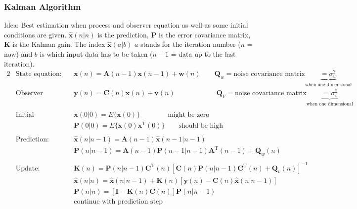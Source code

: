 \subsubsection{Kalman Algorithm}
Idea: Best estimation when process and observer equation as well as some initial conditions are given.
$\mathbf{\hat x}(n|n)$ is the prediction, $\mathbf{P}$ is the error covariance matrix, $\mathbf{K}$ is the Kalman gain.
The index $\mathbf{\hat x}(a|b)$ $a$ stands for the iteration number ($n$ = now) and $b$ is which input
data has to be taken ($n-1$ = data up to the last iteration). 
\begin{alignat}{2}
    &\text{State equation:}\qquad&&\mathbf{x}(n) =\mathbf{A}(n-1)\mathbf{x}(n-1) + \mathbf{w}(n) \qquad 
     \mathbf{Q}_w = \text{noise covariance matrix} \underbrace{= \sigma_w^2}_{\text{when one dimensional}}  \nonumber\\
    &\text{Observer equation:}\qquad&&\mathbf{y}(n) =\mathbf{C}(n)\mathbf{x}(n) + \mathbf{v}(n) \qquad \qquad \quad \quad
   \mathbf{Q}_V = \text{noise covariance matrix} \underbrace{= \sigma_v^2}_{\text{when one dimensional}} \nonumber\\
    \nonumber\\
    &\text{Initial condition:}    \qquad    &&\mathbf{x}(0|0)=E\{\mathbf{x}(0)\} \qquad \qquad \text{might be zero}\nonumber\\
                                        &&&\mathbf{P}(0|0)=E\{\mathbf{x}(0)\mathbf{x}^{\mathrm T}(0)\} \qquad \text{should be high}\nonumber\\
    \nonumber\\
    &\text{Prediction:}            \qquad    &&\mathbf{\hat{x}}(n|n-1)=\mathbf{A}(n-1)\mathbf{\hat{x}}(n-1|n-1)\\
                                        &&&\mathbf{P}(n|n-1)=\mathbf{A}(n-1)\mathbf{P}(n-1|n-1)\mathbf{A}^{\mathrm T}(n-1) + \mathbf{Q}_w(n)\\
    \nonumber\\
    &\text{Update:}                \qquad    &&\mathbf{K}(n)=\mathbf{P}(n|n-1)\mathbf{C}^{\mathrm T}(n)\left[\mathbf{C}(n) \mathbf{P}(n|n-1)\mathbf{C}^{\mathrm T}(n)+\mathbf{Q}_v(n)\right]^{-1}\\
                                        &&&\mathbf{\hat{x}}(n|n)=\mathbf{\hat{x}}(n|n-1)+\mathbf{K}(n)\left[\mathbf{y}(n)-\mathbf{C}(n)\mathbf{\hat{x}}(n|n-1)\right]\\
                                        &&&\mathbf{P}(n|n)=\left[\mathbf{I}-\mathbf{K}(n)\mathbf{C}(n)\right]\mathbf{P}(n|n-1)\\
                                        &&&\text{continue with prediction step}    
\end{alignat}


